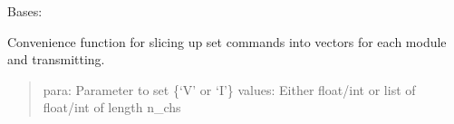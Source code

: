 \documentclass[letterpaper,10pt,english]{sphinxmanual}
\begin{document}
\begin{fulllineitems}
\label{\detokenize{qontrol:qontrol.QXOutput}}
Bases: {\hyperref[\detokenize{qontrol:qontrol.Qontroller}]{}}

\begin{fulllineitems}
\label{\detokenize{qontrol:qontrol.QXOutput.get_all_values}}
\end{fulllineitems}


\begin{fulllineitems}
\label{\detokenize{qontrol:qontrol.QXOutput.get_value}}
\end{fulllineitems}


\begin{fulllineitems}
\label{\detokenize{qontrol:qontrol.QXOutput.set_all_values}}
Convenience function for slicing up set commands into vectors for each module and transmitting.
\begin{quote}

para:          Parameter to set \{‘V’ or ‘I’\}
values:        Either float/int or list of float/int of length n\_chs
\end{quote}

\end{fulllineitems}


\begin{fulllineitems}
\label{\detokenize{qontrol:qontrol.QXOutput.set_value}}
\end{fulllineitems}


\end{fulllineitems}
\end{document}
